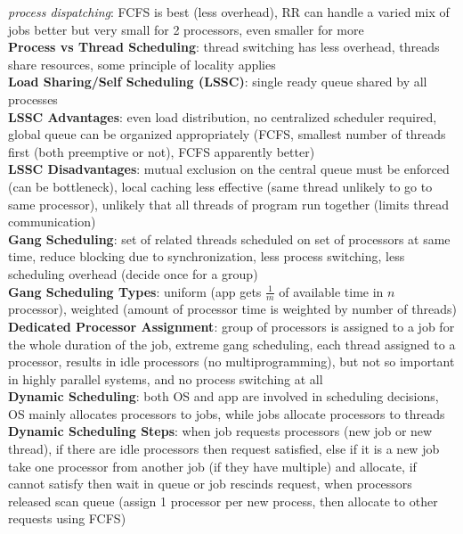 \documentclass[a4paper]{article}
\begin{document}
\begin{multicols}{2}
        \textit{process dispatching}: FCFS is best (less overhead), RR can handle a varied mix of jobs better but very small for 2 processors, even smaller for more\\
        \textbf{Process vs Thread Scheduling}: thread switching has less overhead, threads share resources, some principle of locality applies\\
        \textbf{Load Sharing/Self Scheduling (LSSC)}: single ready queue shared by all processes\\
        \textbf{LSSC Advantages}: even load distribution, no centralized scheduler required, global queue can be organized appropriately (FCFS, smallest number of threads first (both preemptive or not), FCFS apparently better)\\
        \textbf{LSSC Disadvantages}: mutual exclusion on the central queue must be enforced (can be bottleneck), local caching less effective (same thread unlikely to go to same processor), unlikely that all threads of program run together (limits thread communication)\\
        \textbf{Gang Scheduling}: set of related threads scheduled on set of processors at same time, reduce blocking due to synchronization, less process switching, less scheduling overhead (decide once for a group)\\
        \textbf{Gang Scheduling Types}: uniform (app gets $\frac{1}{m}$ of available time in $n$ processor), weighted (amount of processor time is weighted by number of threads)\\
        \textbf{Dedicated Processor Assignment}: group of processors is assigned to a job for the whole duration of the job, extreme gang scheduling, each thread assigned to a processor, results in idle processors (no multiprogramming), but not so important in highly parallel systems, and no process switching at all\\
        \textbf{Dynamic Scheduling}: both OS and app are involved in scheduling decisions, OS mainly allocates processors to jobs, while jobs allocate processors to threads\\
        \textbf{Dynamic Scheduling Steps}: when job requests processors (new job or new thread), if there are idle processors then request satisfied, else if it is a new job take one processor from another job (if they have multiple) and allocate, if cannot satisfy then wait in queue or job rescinds request, when processors released scan queue (assign 1 processor per new process, then allocate to other requests using FCFS)\\

\end{multicols}
\end{document}
